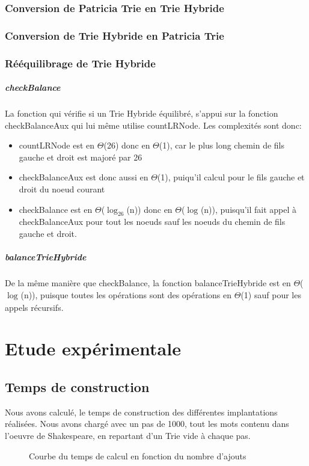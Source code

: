 \documentclass[a4paper,12pt]{report}
\begin{document}
\subsection{Conversion de Patricia Trie en Trie Hybride}

\subsection{Conversion de Trie Hybride en Patricia Trie}

\subsection{Rééquilibrage de Trie Hybride}
\paragraph{checkBalance}
La fonction qui vérifie si un Trie Hybride équilibré, s'appui sur la fonction checkBalanceAux qui lui même utilise countLRNode.
Les complexités sont donc:
\begin{itemize}
 \item countLRNode est en $\Theta$(26) donc en $\Theta$(1), car le plus long chemin de fils gauche et droit est majoré par 26
 \item checkBalanceAux est donc aussi en $\Theta$(1), puiqu'il calcul pour le fils gauche et droit du noeud courant
 \item checkBalance est en $\Theta$($\log_{26}$(n)) donc en $\Theta$($\log_{}$(n)), puisqu'il fait appel à checkBalanceAux 
pour tout les noeuds sauf les noeuds du chemin de fils gauche et droit.
\end{itemize}

\paragraph{balanceTrieHybride}
De la même manière que checkBalance, la fonction balanceTrieHybride est en $\Theta$($\log_{}$(n)), puisque toutes les opérations
sont des opérations en $\Theta$(1) sauf pour les appels récursifs.

\chapter{Etude expérimentale}
\section{Temps de construction}
Nous avons calculé, le temps de construction des différentes implantations réalisées. Nous avons chargé avec un pas de 1000,
tout les mots contenu dans l'oeuvre de Shakespeare, en repartant d'un Trie vide à chaque pas.
\begin{figure}[!htbp]
\caption{Courbe du temps de calcul en fonction du nombre d'ajouts}
\end{figure}
\end{document}
